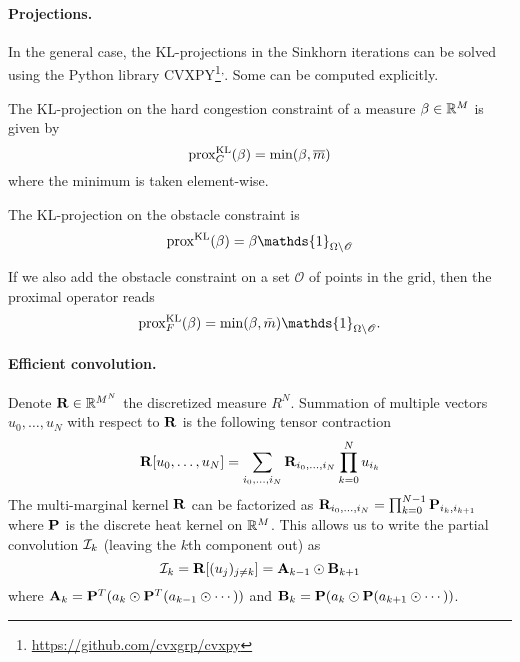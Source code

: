 \documentclass[../report.tex]{subfiles}
\begin{document}
\paragraph{Projections.}
In the general case, the KL-projections in the Sinkhorn iterations can be solved using the Python library CVXPY\footnote{\url{https://github.com/cvxgrp/cvxpy}}\textsuperscript{,}. Some can be computed explicitly.


\begin{prop}
	The KL-projection on the hard congestion constraint of a measure $\beta\in\mathbb{R}^M$ is given by
	\begin{equation}
	\operatorname{prox}^{\operatorname{KL}}_C(\beta) = \min(\beta,\overline{m})
	\end{equation}
	where the minimum is taken element-wise.
	
	The KL-projection on the obstacle constraint is
	\begin{equation}
	\prox^{\KL}(\beta) = \beta \mathds{1}_{\Omega\backslash\mathscr{O}}
	\end{equation}
	
	If we also add the obstacle constraint on a set $\mathscr{O}$ of points in the grid, then the proximal operator reads
	\begin{equation}
	\prox^{\KL}_F(\beta) = \min(\beta, \bar{m})\mathds{1}_{\Omega\backslash\mathscr{O}}.
	\end{equation}
\end{prop}


\paragraph{Efficient convolution.} Denote $\mathbf{R} \in \mathbb{R}^{M^N}$ the discretized measure $R^N$. Summation of multiple vectors $u_0,\ldots,u_N$ with respect to $\mathbf{R}$ is the following tensor contraction
\[
	\mathbf{R}[u_0,\ldots,u_N] =
	\sum_{i_0,\ldots,i_N} \mathbf{R}_{i_0,\ldots,i_N}\prod_{k=0}^N u_{i_k}
\]
The multi-marginal kernel $\mathbf{R}$ can be factorized as $\mathbf{R}_{i_0,\ldots,i_N} = \prod_{k=0}^{N-1} \mathbf{P}_{i_k,i_{k+1}}$ where $\mathbf{P}$ is the discrete heat kernel on $\mathbb{R}^M$. This allows us to write the partial convolution $\mathcal{I}_k$ (leaving the $k$th component out) as
\begin{equation}
	\mathcal{I}_k = \mathbf{R}[(u_j)_{j\neq k}] =
	\mathbf{A}_{k-1} \odot \mathbf{B}_{k+1}
\end{equation}
where $\mathbf{A}_{k} = \mathbf{P}^T (a_k \odot \mathbf{P}^T(a_{k-1} \odot \cdots))$ and $\mathbf{B}_k = \mathbf{P} (a_k \odot \mathbf{P} (a_{k+1}\odot \cdots))$.
\end{document}
